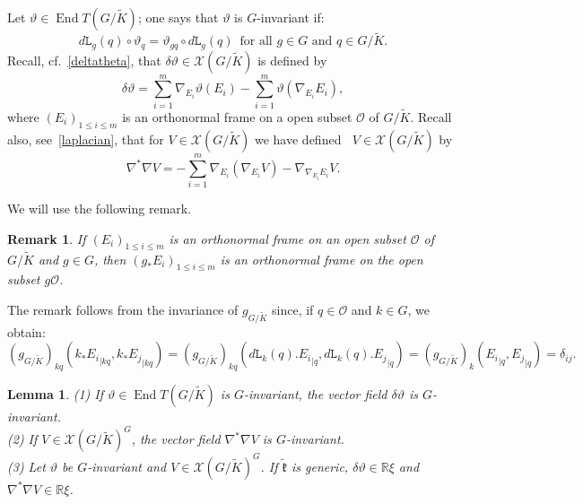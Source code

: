 \documentclass[a4paper,reqno]{amsart}
\newtheorem{lem}[thm]{Lemma}
\newtheorem{remm}[thm]{Remark}
\theoremstyle{definition}
\theoremstyle{remark}
\theoremstyle{plain}
\numberwithin{equation}{section}
\newcommand{\R}{{\mathbb{R}}}
\newcommand{\calX}{{\mathcal{X}}}
\newcommand{\calO}{{\mathcal{O}}}  \newcommand{\cO}{{\mathcal{O}}}
\def\End{\operatorname {End}}
\DeclareMathOperator{\rough}{{\nabla^*\nabla}}
\newcommand{\vtheta}{\vartheta}
\newcommand{\Kt}{{\widetilde{K}}}
\newcommand{\wK}{{\widetilde{K}}}
\newcommand{\wk}{{\widetilde{\mathfrak{k}}}}
\newcommand{\ltr}{\mathtt{L}}
\begin{document}
Let $\vtheta \in \End T(G/\Kt)$; one says that $\vtheta$ is
$G$-invariant if:
\begin{equation*}
  d\ltr_g(q) \circ \vtheta_q= \vtheta_{gq} \circ
  d\ltr_g(q) \ \; \text{for all $g \in G$ and $q \in G/\Kt$}.
\end{equation*}
Recall, cf.~\eqref{deltatheta}, that
$\delta \vtheta \in \calX(G/\Kt)$ is defined by
$$\delta \vtheta = \sum_{i=1}^m \nabla_{E_i} \vtheta(E_i) -
\sum_{i=1}^m \vtheta(\nabla_{E_i} E_i),$$
where $(E_i)_{1 \le i \le m}$ is an orthonormal frame
on a open subset $\calO$ of $G/\Kt$.
Recall also, see~\eqref{laplacian}, that for $V \in \calX(G/\Kt)$ we have defined $\rough
V \in \calX(G/\Kt)$ by 
$$\nabla^*\nabla V=-\sum_{i=1}^m
\nabla_{E_i}(\nabla_{E_i}V) - \nabla_{\nabla_{E_i}E_i}V.$$ 


We will use the following remark.

\begin{remm} \label{rema}
   If $(E_i)_{1 \le i \le m}$ is an orthonormal frame on an open
subset $\calO$ of $G/\Kt$ and $g \in G$, then
$(g_*E_i)_{1 \le i \le m}$ is an orthonormal frame on the open
subset $g\calO$.
\end{remm}

\noindent  The remark follows from the invariance
of $g_{\scriptscriptstyle{G/\wK}}$ since, if $q \in \calO$ and $k \in G$, we obtain:
\[
(g_{\scriptscriptstyle{G/\wK}})_{kq}({k_*E_i}_{\mid kq}, {k_*E_j}_{\mid kq})=
(g_{\scriptscriptstyle{G/\wK}})_{kq}(d\ltr_k(q).{E_i}_{\mid q}, d\ltr_k(q).{E_j}_{\mid q}) 
= (g_{\scriptscriptstyle{G/\wK}})_{k}({E_i}_{\mid q}, {E_j}_{\mid q}) = \delta_{ij}.
\]




\begin{lem}
  \label{lem2.2} \label{lem2.3}
  {\rm (1) } If
  $\vtheta \in \End T(G/\Kt)$ is $G$-invariant, the vector field
  $\delta\vtheta$ is $G$-invariant.
  \\
  {\rm (2)} If $V \in \calX(G/\Kt)^G$, the vector field
  $\nabla^*\nabla V$ is $G$-invariant.
  \\
  {\rm (3)} Let $\vtheta$ be $G$-invariant and
  $V \in \calX(G/\Kt)^G$.  If $\wk$ is generic,
  $\delta\vtheta \in \R \xi$ and $\nabla^*\nabla V \in \R \xi$.
\end{lem}
\end{document}
